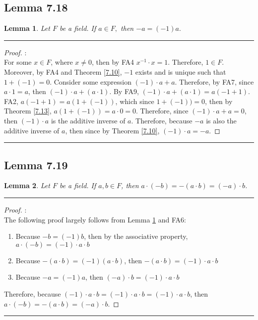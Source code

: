 \documentclass[openany, amssymb, psamsfonts]{amsart}
\newtheorem{lem}{Lemma}[section]
\theoremstyle{definition}
\numberwithin{equation}{section}
\begin{document}
\subsection*{Lemma 7.18}
\begin{lem}
\label{7.18}
	Let $F$ be a field. If $a\in F,$ then $-a=(-1)a.$
\end{lem}
\vspace{4pt}     \hrule   \vspace{4pt}
\begin{proof}:\\
For some $x\in F$, where $x\neq 0$, then by FA4 $x^{-1}\cdot x =1$. Therefore, $1\in F$. Moreover, by FA4 and Theorem \ref{7.10}, $-1$ exists and is unique such that $1+(-1)=0$. Consider some expression $(-1)\cdot a +a$. Therefore, by FA7, since $a\cdot 1 =a$, then $(-1)\cdot a +(a\cdot 1)$. By FA9, $(-1)\cdot a +(a\cdot 1) = a(-1+1)$. FA2, $a(-1+1) = a(1+(-1))$, which since $1+(-1)) = 0$, then by Theorem \ref{7.13}, $a(1+(-1)) = a\cdot 0 = 0$. 
Therefore, since $(-1)\cdot a +a = 0$, then $(-1)\cdot a$ is the additive inverse of $a$. Therefore, because $-a$ is also the additive inverse of $a$, then since by Theorem \ref{7.10}, $(-1)\cdot a = -a$. 
\end{proof}
\vspace{4pt}     \hrule   \vspace{4pt}

\subsection*{Lemma 7.19}
\begin{lem}
\label{7.19}
	Let $F$ be a field. If $a, b\in F$, then $a \cdot (-b )= -(a \cdot b) = (-a) \cdot b$.
\end{lem}
\vspace{4pt}     \hrule   \vspace{4pt}
\begin{proof}:\\
The following proof largely follows from Lemma \ref{7.18} and FA6:
\begin{enumerate}
    \item Because $-b = (-1)b$, then by the associative property, $a \cdot (-b) = (-1) \cdot a \cdot b$
    \item Because $-(a\cdot b) = (-1)(a \cdot b)$, then $-(a\cdot b) = (-1)\cdot a \cdot b$
    \item Because $-a = (-1)a$, then $(-a)\cdot b = (-1) \cdot a \cdot b$
\end{enumerate}
Therefore, because $(-1) \cdot a \cdot b = (-1) \cdot a \cdot b = (-1) \cdot a \cdot b$, then $a \cdot (-b )= -(a \cdot b) = (-a) \cdot b$.
\end{proof}
\vspace{4pt}     \hrule   \vspace{4pt}
\end{document}
